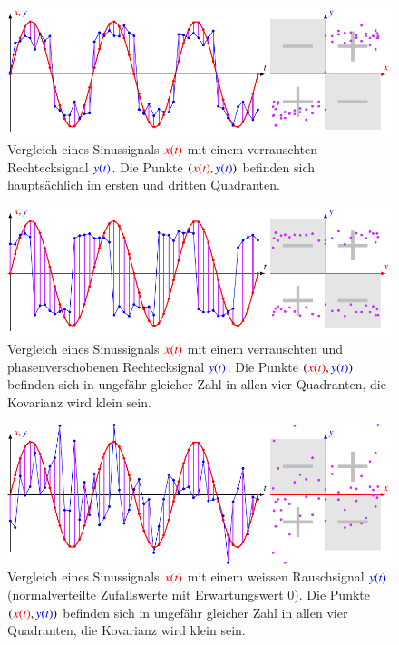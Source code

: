 \begin{figure}
\centering
\includegraphics[width=\hsize]{chapters/1-geometrie/images/sinrect.pdf}
\caption{Vergleich eines Sinussignals $\color{red}x(t)$ mit einem
verrauschten Rechtecksignal $\color{blue}y(t)$.
Die Punkte $({\color{red}x(t)},{\color{blue}y(t)})$ befinden sich
hauptsächlich im ersten und dritten Quadranten.
\label{geometrie:kovarianz:sinrect:image}}
\end{figure}
\begin{figure}
\centering
\includegraphics[width=\hsize]{chapters/1-geometrie/images/cosrect.pdf}
\caption{Vergleich eines Sinussignals $\color{red}x(t)$ mit einem
verrauschten und phasenverschobenen Rechtecksignal $\color{blue}y(t)$.
Die Punkte $({\color{red}x(t)},{\color{blue}y(t)})$ befinden sich
in ungefähr gleicher Zahl in allen vier Quadranten, die Kovarianz
wird klein sein.
\label{geometrie:kovarianz:cosrect:image}}
\end{figure}
\begin{figure}
\centering
\includegraphics[width=\hsize]{chapters/1-geometrie/images/sinrand.pdf}
\caption{Vergleich eines Sinussignals $\color{red}x(t)$ mit einem
weissen Rauschsignal $\color{blue}y(t)$ (normalverteilte Zufallswerte
mit Erwartungswert $0$).
Die Punkte $({\color{red}x(t)},{\color{blue}y(t)})$ befinden sich
in ungefähr gleicher Zahl in allen vier Quadranten, die Kovarianz
wird klein sein.
\label{geometrie:kovarianz:sinrand:image}}
\end{figure}


